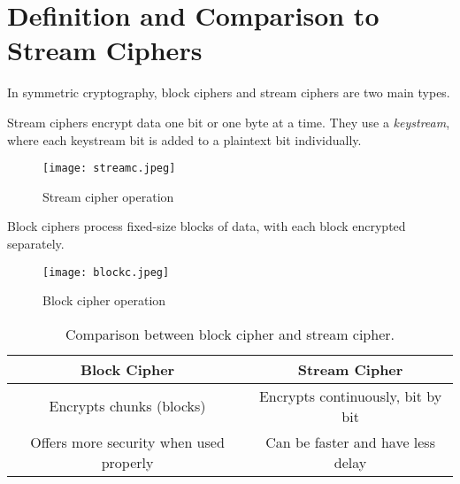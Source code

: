 \section{Definition and Comparison to Stream Ciphers}

In symmetric cryptography, block ciphers and stream ciphers are two main types.

Stream ciphers encrypt data one bit or one byte at a time. 
They use a \textit{keystream}, where each keystream bit is added to a plaintext bit individually.

\begin{figure}[h] %
    \centering
    \texttt{[image: streamc.jpeg]}
    \caption{Stream cipher operation}
    \label{fig:stream_cipher}
\end{figure}

Block ciphers process fixed-size blocks of data, with each block encrypted separately.

\begin{figure}[h]
    \centering
    \texttt{[image: blockc.jpeg]}
    \caption{Block cipher operation}
    \label{fig:block_cipher}
\end{figure}



\begin{table}[h]
\centering
\begin{tabular}{|c|c|}
\hline
\textbf{Block Cipher} & \textbf{Stream Cipher} \\
\hline
Encrypts chunks (blocks) & Encrypts continuously, bit by bit \\
\hline
Offers more security when used properly & Can be faster and have less delay \\
\hline
\end{tabular}
\caption{Comparison between block cipher and stream cipher.}
\label{tab:block_vs_stream}
\end{table}